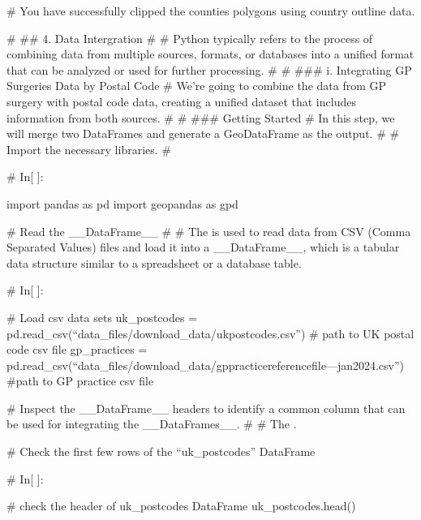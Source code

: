 \documentclass[letterpaper,10pt,english]{sphinxmanual}
\begin{document}
\sphinxAtStartPar
\# You have successfully clipped the counties polygons using country outline data.

\sphinxAtStartPar
\# \#\# 4. Data Intergration
\#
\# Python typically refers to the process of combining data from multiple sources, formats, or databases into a unified format that can be analyzed or used for further processing.
\#
\# \#\#\# i. Integrating GP Surgeries Data by Postal Code
\# We’re going to combine the data from GP surgery with postal code data, creating a unified dataset that includes information from both sources.
\#
\# \#\#\# Getting Started
\# In this step, we will merge two DataFrames and generate a GeoDataFrame as the output.
\#
\# Import the necessary libraries.
\#

\sphinxAtStartPar
\# In{[} {]}:

\sphinxAtStartPar
import pandas as pd
import geopandas as gpd

\sphinxAtStartPar
\# Read the \_\_DataFrame\_\_
\#
\# The  is used to read data from CSV (Comma Separated Values) files and load it into a \_\_DataFrame\_\_, which is a tabular data structure similar to a spreadsheet or a database table.

\sphinxAtStartPar
\# In{[} {]}:

\sphinxAtStartPar
\# Load csv data sets
uk\_postcodes = pd.read\_csv(“data\_files/download\_data/ukpostcodes.csv”) \# path to UK postal code csv file
gp\_practices = pd.read\_csv(“data\_files/download\_data/gp\sphinxhyphen{}practice\sphinxhyphen{}reference\sphinxhyphen{}file—jan\sphinxhyphen{}2024.csv”) \#path to GP practice csv file

\sphinxAtStartPar
\# Inspect the \_\_DataFrame\_\_ headers to identify a common column that can be used for integrating the \_\_DataFrames\_\_.
\#
\# The .

\sphinxAtStartPar
\# Check the first few rows of the “uk\_postcodes” DataFrame

\sphinxAtStartPar
\# In{[} {]}:

\sphinxAtStartPar
\# check the header of uk\_postcodes DataFrame
uk\_postcodes.head()
\end{document}
